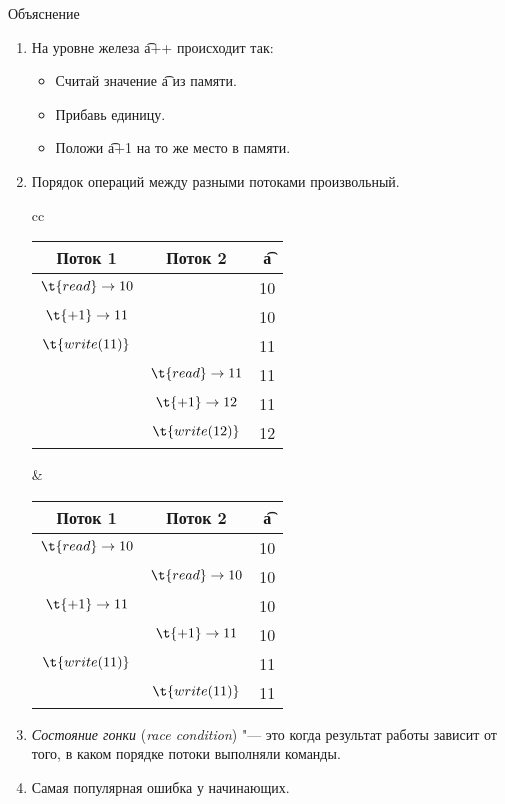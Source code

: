 \begin{frame}{Объяснение}
	\begin{enumerate}
		\item На уровне железа \t{a++} происходит так:
			\begin{itemize}
				\item Считай значение \t{a} из памяти.
				\item Прибавь единицу.
				\item Положи \t{a+1} на то же место в памяти.
			\end{itemize}
		\pause
		\item
			Порядок операций между разными потоками произвольный.
			\pause
			\begin{center}
				\begin{tabular}{cc}
					\begin{tabular}{c|cc}
						Поток 1 & Поток 2 & \t{a} \\ \hline
						$\t{read} \to 10$ & & 10 \\
						$\t{+1} \to 11$ & & 10 \\
						$\t{write(11)}$ & & 11 \\
						& $\t{read} \to 11$ & 11 \\
						& $\t{+1} \to 12$ & 11 \\
						& $\t{write(12)}$ & 12 \\
					\end{tabular}
					&
					\begin{tabular}{c|cc}
						Поток 1 & Поток 2 & \t{a} \\ \hline
						$\t{read} \to 10$ & & 10 \\
						& $\t{read} \to 10$ & 10\\
						$\t{+1} \to 11$ & & 10 \\
						& $\t{+1} \to 11$ & 10 \\
						$\t{write(11)}$ & & 11 \\
						& $\t{write(11)}$ & 11 \\
					\end{tabular}
				\end{tabular}
			\end{center}
		\item
			\textit{Состояние гонки} (\textit{race condition}) "--- это когда результат работы зависит от того, в каком порядке потоки выполняли команды.
		\item
			Самая популярная ошибка у начинающих.
	\end{enumerate}
\end{frame}
